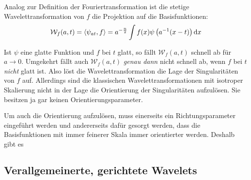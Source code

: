 

Analog zur Definition der Fouriertransformation ist die stetige Wavelettransformation von $f$ die Projektion auf die Basisfunktionen:
\begin{equation}
    \mathcal{W}_f (a,t) = \left\langle\psi_{at},f\right\rangle
    = a^{-\frac{n}{2}} \int f(x) \psi \left(a^{-1}(x-t)\right) \mathop{}\!\mathrm{d} x
\end{equation}

Ist $\psi$ eine glatte Funktion und $f$ bei $t$ glatt, so fällt $\mathcal{W}_f (a,t)$ schnell ab für $a \to 0$.
Umgekehrt fällt auch $\mathcal{W}_f(a,t)$ \emph{genau dann} nicht schnell ab, wenn $f$ bei $t$ \emph{nicht} glatt ist. Also löst die Wavelettransformation die Lage der Singularitäten von $f$ auf. Allerdings sind die klassischen  Wavelettransformationen mit isotroper Skalierung nicht in der Lage die  Orientierung der Singularitäten aufzulösen. Sie besitzen ja gar keinen Orientierungsparameter.

Um auch die Orientierung aufzulösen, muss einerseits ein Richtungsparameter eingeführt werden und andererseits dafür gesorgt werden, dass die Basisfunktionen mit immer feinerer Skala immer orientierter werden. Deshalb gibt es


\subsection{Verallgemeinerte, gerichtete Wavelets} %
\label{sec:verallgemeinerte_gerichtete_wavelets}

